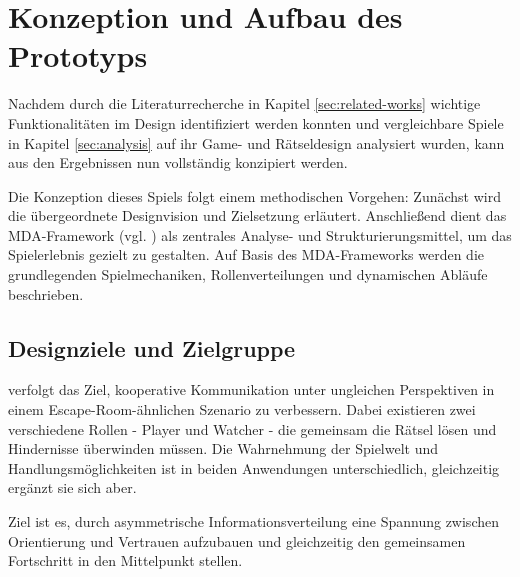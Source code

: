 \chapter{Konzeption und Aufbau des Prototyps}

Nachdem durch die Literaturrecherche in Kapitel \ref{sec:related-works} wichtige Funktionalitäten im Design identifiziert werden konnten und vergleichbare Spiele in Kapitel \ref{sec:analysis} auf ihr Game- und Rätseldesign analysiert wurden, kann aus den Ergebnissen  nun vollständig konzipiert werden.

Die Konzeption dieses Spiels folgt einem methodischen Vorgehen: Zunächst wird die übergeordnete Designvision und Zielsetzung erläutert. Anschließend dient das \ac{MDA}-Framework (vgl. \cite{hunicke_mda_2004}) als zentrales Analyse- und Strukturierungsmittel, um das Spielerlebnis gezielt zu gestalten. Auf Basis des \ac{MDA}-Frameworks werden die grundlegenden Spielmechaniken, Rollenverteilungen und dynamischen Abläufe beschrieben.

\section{Designziele und Zielgruppe}
 verfolgt das Ziel, kooperative Kommunikation unter ungleichen Perspektiven in einem Escape-Room-ähnlichen Szenario zu verbessern. Dabei existieren zwei verschiedene Rollen - Player und Watcher - die gemeinsam die Rätsel lösen und Hindernisse überwinden müssen. Die Wahrnehmung der Spielwelt und Handlungsmöglichkeiten ist in beiden Anwendungen unterschiedlich, gleichzeitig ergänzt sie sich aber. 

Ziel ist es, durch asymmetrische Informationsverteilung eine Spannung zwischen Orientierung und Vertrauen aufzubauen und gleichzeitig den gemeinsamen Fortschritt in den Mittelpunkt stellen.




